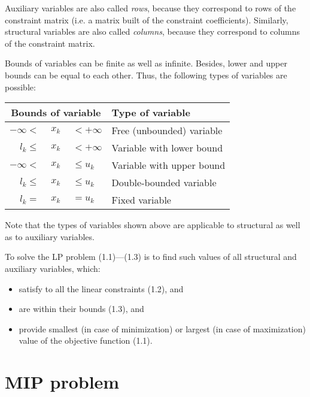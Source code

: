 Auxiliary variables are also called {\it rows}, because they correspond
to rows of the constraint matrix (i.e. a matrix built of the constraint
coefficients). Similarly, structural variables are also called
{\it columns}, because they correspond to columns of the constraint
matrix.

Bounds of variables can be finite as well as infinite. Besides, lower
and upper bounds can be equal to each other. Thus, the following types
of variables are possible:

\begin{center}
\begin{tabular}{r@{}c@{}ll}
\multicolumn{3}{c}{Bounds of variable} & Type of variable \\
\hline
$-\infty <$ &$\ x_k\ $& $< +\infty$ & Free (unbounded) variable \\
$l_k \leq$ &$\ x_k\ $& $< +\infty$  & Variable with lower bound \\
$-\infty <$ &$\ x_k\ $& $\leq u_k$  & Variable with upper bound \\
$l_k \leq$ &$\ x_k\ $& $\leq u_k$   & Double-bounded variable \\
$l_k =$ &$\ x_k\ $& $= u_k$         & Fixed variable \\
\end{tabular}
\end{center}

\noindent
Note that the types of variables shown above are applicable to
structural as well as to auxiliary variables.

To solve the LP problem (1.1)---(1.3) is to find such values of all
structural and auxiliary variables, which:

\vspace*{-10pt}

\begin{itemize}\setlength{\itemsep}{0pt}
\item satisfy to all the linear constraints (1.2), and

\item are within their bounds (1.3), and

\item provide smallest (in case of minimization) or largest (in case of
maximization) value of the objective function (1.1).
\end{itemize}

\section{MIP problem}

